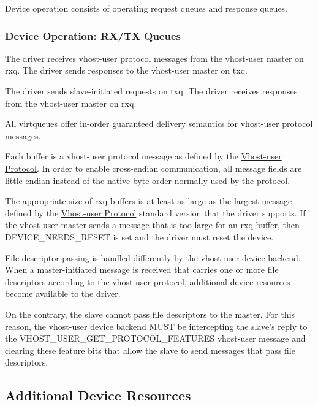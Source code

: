 Device operation consists of operating request queues and response queues.

\subsubsection{Device Operation: RX/TX Queues}\label{sec:Device Types / Vhost-user Device Backend / Device Operation / Device Operation: RX/TX Queues}

The driver receives vhost-user protocol messages from the vhost-user master on
rxq.  The driver sends responses to the vhost-user master on txq.

The driver sends slave-initiated requests on txq.  The driver receives
responses from the vhost-user master on rxq.

All virtqueues offer in-order guaranteed delivery semantics for vhost-user
protocol messages.

Each buffer is a vhost-user protocol message as defined by the
\hyperref[intro:Vhost-user Protocol]{Vhost-user Protocol}.  In order to enable
cross-endian communication, all message fields are little-endian instead of the
native byte order normally used by the protocol.

The appropriate size of rxq buffers is at least as large as the largest message
defined by the \hyperref[intro:Vhost-user Protocol]{Vhost-user Protocol}
standard version that the driver supports.  If the vhost-user master sends a
message that is too large for an rxq buffer, then DEVICE_NEEDS_RESET is set and
the driver must reset the device.

File descriptor passing is handled differently by the vhost-user device backend.
When a master-initiated message is received that carries one or more file
descriptors according to the vhost-user protocol, additional device resources
become available to the driver.

On the contrary, the slave cannot pass file descriptors to the master. For this
reason, the vhost-user device backend MUST be intercepting the slave's reply to
the VHOST_USER_GET_PROTOCOL_FEATURES vhost-user message and clearing these
feature bits that allow the slave to send messages that pass file descriptors.

\subsection{Additional Device Resources}\label{sec:Device Types / Vhost-user Device Backend / Additional Device Resources}


